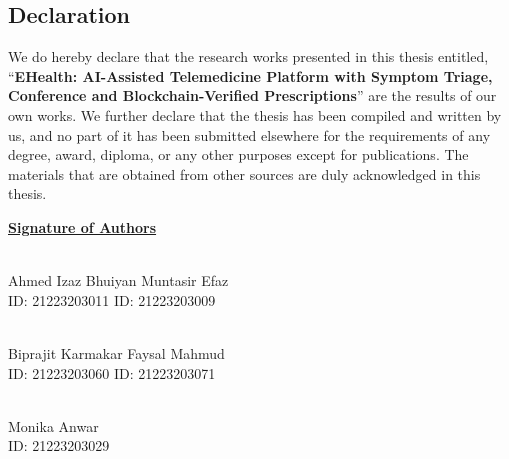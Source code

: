 \begin{center}
    \section*{Declaration}
\end{center}
\large

\noindent We do hereby declare that the research works presented in this thesis entitled,
``\textbf{EHealth: AI-Assisted Telemedicine Platform with Symptom Triage, Conference and
Blockchain-Verified Prescriptions}'' are the results of our own works. We further declare
that the thesis has been compiled and written by us, and no part of it has been submitted
elsewhere for the requirements of any degree, award, diploma, or any other purposes except
for publications. The materials that are obtained from other sources are duly acknowledged
in this thesis.

\vspace{10mm}
\begin{flushleft}

\textbf{\underline{Signature of Authors}} \null\hfill

\vspace{10mm}

\underline{\makebox[4cm][c]{\textit{}}} \null\hfill
\underline{\makebox[4cm][c]{\textit{}}} \\
Ahmed Izaz Bhuiyan \null\hfill Muntasir Efaz \\
ID: 21223203011 \null\hfill ID: 21223203009 \\

\vspace{8mm}

\underline{\makebox[4cm][c]{\textit{}}} \null\hfill
\underline{\makebox[4cm][c]{\textit{}}}\\
Biprajit Karmakar \null\hfill Faysal Mahmud \\
ID: 21223203060 \null\hfill ID: 21223203071 \\

\vspace{8mm}

\underline{\makebox[4cm][c]{\textit{}}}\\
Monika Anwar \\
ID: 21223203029 \\
\end{flushleft}